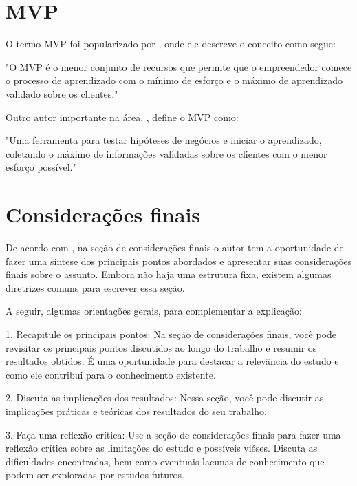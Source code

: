 \documentclass[
	article,			%
	12pt,				%
	oneside,			%
	a4paper,			%
    BIBLATEX,           %
	english,			%
	brazil,				%
	sumario=tradicional
	]{abntex2}
\begin{document}
\section{MVP}

O termo MVP foi popularizado por  , onde ele descreve o conceito como segue:

"O MVP é o menor conjunto de recursos que permite que o empreendedor comece o processo de aprendizado com o mínimo de esforço e o máximo de aprendizado validado sobre os clientes."

Outro autor importante na área, , define o MVP como:

"Uma ferramenta para testar hipóteses de negócios e iniciar o aprendizado, coletando o máximo de informações validadas sobre os clientes com o menor esforço possível."


% 

\section{Considerações finais}

De acordo com , na seção de considerações finais o autor tem a oportunidade de fazer uma síntese dos principais pontos abordados e apresentar suas considerações finais sobre o assunto. Embora não haja uma estrutura fixa, existem algumas diretrizes comuns para escrever essa seção.

A seguir, algumas orientações gerais, para complementar a explicação:

1. Recapitule os principais pontos: Na seção de considerações finais, você pode revisitar os principais pontos discutidos ao longo do trabalho e resumir os resultados obtidos. É uma oportunidade para destacar a relevância do estudo e como ele contribui para o conhecimento existente.

2. Discuta as implicações dos resultados: Nessa seção, você pode discutir as implicações práticas e teóricas dos resultados do seu trabalho. 

3. Faça uma reflexão crítica: Use a seção de considerações finais para fazer uma reflexão crítica sobre as limitações do estudo e possíveis viéses. Discuta as dificuldades encontradas, bem como eventuais lacunas de conhecimento que podem ser exploradas por estudos futuros.
\end{document}
